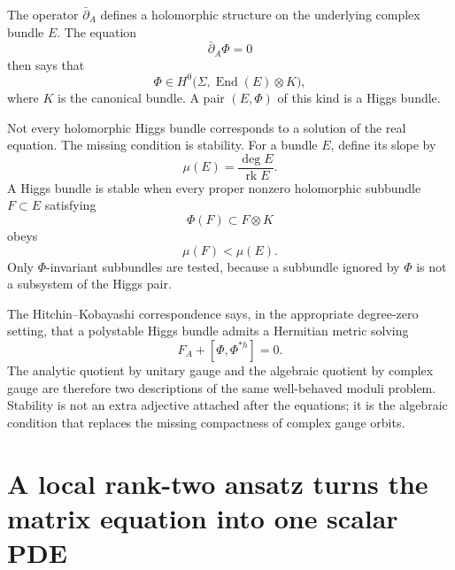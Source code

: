 The operator \(\bar\partial_A\) defines a holomorphic structure on the underlying complex bundle \(E\).  The equation
\[
  \bar\partial_A\Phi=0
\]
then says that
\[
  \Phi\in H^0\bigl(\Sigma,\operatorname{End}(E)\otimes K\bigr),
\]
where \(K\) is the canonical bundle.  A pair \((E,\Phi)\) of this kind is a Higgs bundle.

Not every holomorphic Higgs bundle corresponds to a solution of the real equation.  The missing condition is stability.  For a bundle \(E\), define its slope by
\[
  \mu(E)=\frac{\deg E}{\operatorname{rk}E}.
\]
A Higgs bundle is stable when every proper nonzero holomorphic subbundle \(F\subset E\) satisfying
\[
  \Phi(F)\subset F\otimes K
\]
obeys
\[
  \mu(F)<\mu(E).
\]
Only \(\Phi\)-invariant subbundles are tested, because a subbundle ignored by \(\Phi\) is not a subsystem of the Higgs pair.

The Hitchin--Kobayashi correspondence says, in the appropriate degree-zero setting, that a polystable Higgs bundle admits a Hermitian metric solving
\[
  F_A+[\Phi,\Phi^{*h}]=0.
\]
The analytic quotient by unitary gauge and the algebraic quotient by complex gauge are therefore two descriptions of the same well-behaved moduli problem.  Stability is not an extra adjective attached after the equations; it is the algebraic condition that replaces the missing compactness of complex gauge orbits.

\section{A local rank-two ansatz turns the matrix equation into one scalar PDE}

